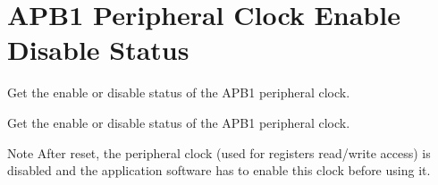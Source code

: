 \hypertarget{group___r_c_c_ex___a_p_b1___peripheral___clock___enable___disable___status}{}\section{A\+P\+B1 Peripheral Clock Enable Disable Status}
\label{group___r_c_c_ex___a_p_b1___peripheral___clock___enable___disable___status}


Get the enable or disable status of the A\+P\+B1 peripheral clock.  


Get the enable or disable status of the A\+P\+B1 peripheral clock. 

\begin{DoxyNote}{Note}
After reset, the peripheral clock (used for registers read/write access) is disabled and the application software has to enable this clock before using it. 
\end{DoxyNote}
